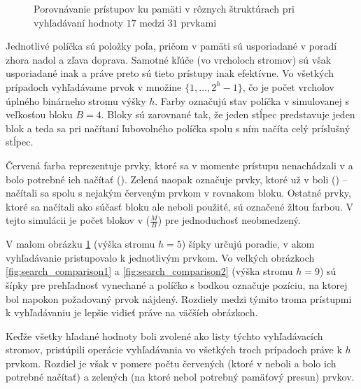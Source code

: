 \begin{figure}[h]
    \centering
    \caption[Porovnávanie prístupov ku pamäti pri vyhľadávaní hodnoty $17$]{Porovnávanie prístupov ku pamäti v rôznych štruktúrach pri vyhľadávaní hodnoty $17$ medzi $31$ prvkami}
    \label{fig:search_comparison_small}
\end{figure}

Jednotlivé políčka sú položky poľa, pričom v pamäti sú usporiadané v poradí zhora nadol a zľava doprava. Samotné kľúče (vo vrcholoch stromov) sú však usporiadané inak a práve preto sú tieto prístupy inak efektívne. Vo všetkých prípadoch vyhľadávame prvok v množine $\{1, \dotsc, 2^h-1\}$, čo je počet vrcholov úplného binárneho stromu výšky $h$. Farby označujú stav políčka v simulovanej \cache s veľkosťou bloku $B=4$. Bloky sú zarovnané tak, že jeden stĺpec predstavuje jeden blok a teda sa pri načítaní ľubovolného políčka spolu s ním načíta celý príslušný stĺpec.

Červená farba reprezentuje prvky, ktoré sa v momente prístupu nenachádzali v \cache a bolo potrebné ich načítať (\miss). Zelená naopak označuje prvky, ktoré už v \cache boli (\hit) -- načítali sa spolu s nejakým červeným prvkom v rovnakom bloku. Ostatné prvky, ktoré sa načítali ako súčasť bloku ale neboli použité, sú označené žltou farbou. V tejto simulácii je počet blokov v \cache ($\frac{M}{B}$) pre jednoduchosť neobmedzený.

V malom obrázku \ref{fig:search_comparison_small} (výška stromu $h=5$) šípky určujú poradie, v akom vyhľadávanie pristupovalo k jednotlivým prvkom. Vo veľkých obrázkoch \ref{fig:search_comparison1} a \ref{fig:search_comparison2} (výška stromu $h=9$) sú šípky pre prehľadnosť vynechané a políčko s bodkou označuje pozíciu, na ktorej bol napokon požadovaný prvok nájdený. Rozdiely medzi týmito troma prístupmi k vyhľadávaniu je lepšie vidieť práve na väčších obrázkoch.

Keďže všetky hľadané hodnoty boli zvolené ako listy týchto vyhľadávacích stromov, pristúpili operácie vyhľadávania vo všetkých troch prípadoch práve k $h$ prvkom. Rozdiel je však v pomere počtu červených (ktoré v \cache neboli a bolo ich potrebné načítať) a zelených (na ktoré nebol potrebný pamäťový presun) prvkov.

